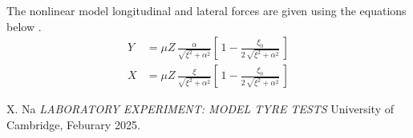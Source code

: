 \documentclass{article}
\begin{document}
The nonlinear model longitudinal and lateral forces are given using the equations below \cite{handout}.
\begin{align}
Y &= \mu Z \,\frac{\alpha}{\sqrt{\xi^2 + \alpha^2}}
\left[\,1 - \frac{\xi_0}{2\,\sqrt{\xi^2 + \alpha^2}}\,\right] \\
    X &= \mu Z \,\frac{\xi}{\sqrt{\xi^2 + \alpha^2}}
    \left[\,1 - \frac{\xi_0}{2\,\sqrt{\xi^2 + \alpha^2}}\,\right]
\end{align}

\begin{thebibliography}{9}


  X. Na
  \emph{LABORATORY EXPERIMENT: MODEL TYRE TESTS}
  University of Cambridge,
  Feburary 2025.

\end{thebibliography}
\end{document}
